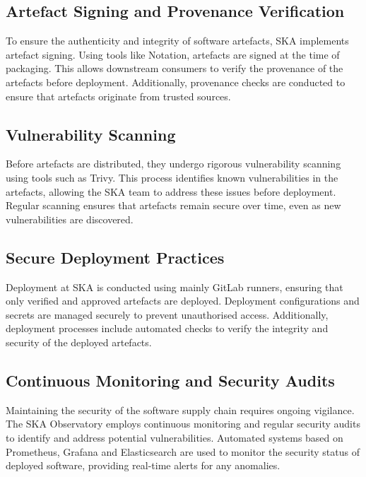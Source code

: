 \documentclass[a4paper]{spie}  %
\begin{document}
\subsection{Artefact Signing and Provenance Verification}

To ensure the authenticity and integrity of software artefacts, SKA implements artefact signing. Using tools like Notation\cite{NotaryProject}, artefacts are signed at the time of packaging. This allows downstream consumers to verify the provenance of the artefacts before deployment. Additionally, provenance checks are conducted to ensure that artefacts originate from trusted sources.

\subsection{Vulnerability Scanning}

Before artefacts are distributed, they undergo rigorous vulnerability scanning using tools such as Trivy. This process identifies known vulnerabilities in the artefacts, allowing the SKA team to address these issues before deployment. Regular scanning ensures that artefacts remain secure over time, even as new vulnerabilities are discovered.

\subsection{Secure Deployment Practices}

Deployment at SKA is conducted using mainly GitLab runners, ensuring that only verified and approved artefacts are deployed. Deployment configurations and secrets are managed securely to prevent unauthorised access. Additionally, deployment processes include automated checks to verify the integrity and security of the deployed artefacts.

\subsection{Continuous Monitoring and Security Audits}

Maintaining the security of the software supply chain requires ongoing vigilance. The SKA Observatory employs continuous monitoring and regular security audits to identify and address potential vulnerabilities. Automated systems based on Prometheus\cite{prometheusPrometheusMonitoringSystem}, Grafana\cite{GrafanaOpenObservability} and Elasticsearch\cite{ElasticSearchAI} are used to monitor the security status of deployed software, providing real-time alerts for any anomalies.
\end{document}

